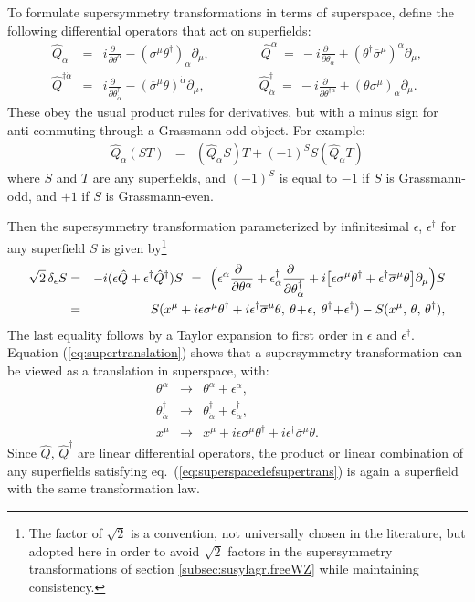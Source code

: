 \documentclass[11pt]{article}
\def\beq{\begin{eqnarray}}
\def\eeq{\end{eqnarray}}
\def\sigmabar{\overline\sigma}
\begin{document}
To formulate supersymmetry transformations in terms of superspace,
define the following differential operators that act on superfields:
\beq
\hat Q_\alpha &=& i \frac{\partial\phantom{x}}{\partial\theta^\alpha} 
- (\sigma^\mu \theta^\dagger)_\alpha \partial_\mu
,
\qquad\qquad
\hat Q^\alpha \>=\> -i\frac{\partial\phantom{x}}{\partial\theta_\alpha} 
+ (\theta^\dagger \sigmabar^\mu)^\alpha \partial_\mu
,
\label{eq:defQhat}
\\
\hat Q^{\dagger\dot\alpha} &=& 
i\frac{\partial\phantom{x}}{\partial\theta^\dagger_{\dot\alpha}} 
- (\sigmabar^\mu \theta)^{\dot\alpha} \partial_\mu
,
\qquad\qquad\>
\hat Q^{\dagger}_{\dot\alpha} \>=\> 
-i\frac{\partial\phantom{x}}{\partial\theta^{\dagger\dot\alpha}} 
+(\theta \sigma^\mu)_{\dot\alpha} \partial_\mu
.
\label{eq:defQdaggerhat}
\eeq
These obey the usual 
product rules for derivatives, but with a minus sign for anti-commuting through
a Grassmann-odd object. For example:
\beq
\hat Q_\alpha (S T) &=& (\hat Q_\alpha S) T + (-1)^S S (\hat Q_\alpha T)
\label{eq:grassmanproductrule}
\eeq
where $S$ and $T$ are any superfields, and $(-1)^S$ is equal to 
$-1$ if $S$ is Grassmann-odd, and $+1$ if $S$ is Grassmann-even.

Then the supersymmetry transformation parameterized by infinitesimal 
$\epsilon$, $\epsilon^\dagger$ for any superfield $S$ is given 
by\footnote{The factor of $\sqrt{2}$ is a convention, not universally 
chosen in the literature, but adopted here in order to avoid $\sqrt{2}$ 
factors in the supersymmetry transformations of section 
\ref{subsec:susylagr.freeWZ} while maintaining consistency.}
\beq
\sqrt{2}\, \delta_{\epsilon} S &=& 
-i
(\epsilon \hat Q + \epsilon^\dagger \hat Q^\dagger) S
\>\,=\>\,
\Bigl (\epsilon^\alpha \frac{\partial\phantom{x}}{\partial\theta^\alpha} 
    + \epsilon^\dagger_{\dot\alpha} 
\frac{\partial\phantom{x}}{\partial\theta^\dagger_{\dot\alpha}}
    + i \bigl [\epsilon \sigma^\mu \theta^\dagger 
       + \epsilon^\dagger \sigmabar^\mu \theta \bigr ] \partial_\mu \Bigr ) S
\label{eq:superspacedefsupertrans}
\\
&=&
S (x^\mu + i \epsilon \sigma^\mu \theta^\dagger 
+ i \epsilon^\dagger \sigmabar^\mu \theta 
, \> \theta\! +\! \epsilon
,\> \theta^\dagger\! +\! \epsilon^\dagger)
-  
S (x^\mu, \, \theta,\, \theta^\dagger)    ,
\label{eq:supertranslation}
\eeq
The last equality follows
by a Taylor expansion to first order in $\epsilon$ and $\epsilon^\dagger$.
Equation (\ref{eq:supertranslation}) shows that a supersymmetry 
transformation can be viewed as a translation in superspace, with:
\beq
\theta^\alpha &\rightarrow& \theta^\alpha + \epsilon^\alpha,
\\
\theta^\dagger_{\dot\alpha} &\rightarrow& \theta^\dagger_{\dot\alpha} 
+ \epsilon^\dagger_{\dot\alpha},
\\
x^\mu &\rightarrow& x^\mu + i \epsilon \sigma^\mu \theta^\dagger 
+ i \epsilon^\dagger \sigmabar^\mu \theta .
\eeq
Since $\hat Q$, $\hat Q^\dagger$ are linear differential operators, the product or 
linear combination of any superfields satisfying 
eq.~(\ref{eq:superspacedefsupertrans}) is again a superfield with the 
same transformation law.
\end{document}
